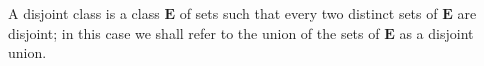 A disjoint class is a class $\mathbf{E}$ of sets such that every two distinct sets of $\mathbf{E}$ are disjoint; in this case we shall refer to the union of the sets of $\mathbf{E}$ as a disjoint union.
